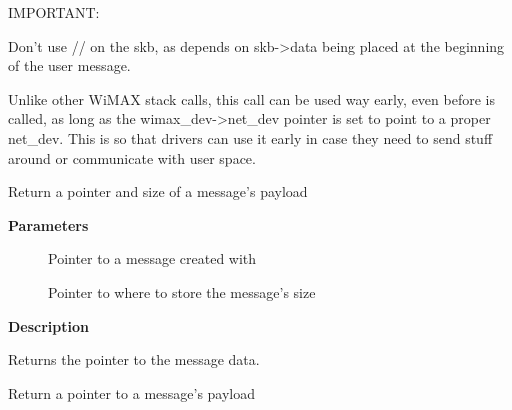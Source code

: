 \documentclass[a4paper,8pt,english]{sphinxmanual}
\begin{document}
IMPORTANT:

Don't use {\hyperref[networking/kapi:c.skb_push]{\emph{}}}/{\hyperref[networking/kapi:c.skb_pull]{\emph{}}}/{\hyperref[networking/kapi:c.skb_reserve]{\emph{}}} on the skb, as
{\hyperref[networking/kapi:c.wimax_msg_send]{\emph{}}} depends on skb-\textgreater{}data being placed at the
beginning of the user message.

Unlike other WiMAX stack calls, this call can be used way early,
even before {\hyperref[networking/kapi:c.wimax_dev_add]{\emph{}}} is called, as long as the
wimax\_dev-\textgreater{}net\_dev pointer is set to point to a proper
net\_dev. This is so that drivers can use it early in case they need
to send stuff around or communicate with user space.

\begin{fulllineitems}
\label{networking/kapi:c.wimax_msg_data_len}
Return a pointer and size of a message's payload

\end{fulllineitems}


\textbf{Parameters}
\begin{description}
\item[{}] \leavevmode
Pointer to a message created with {\hyperref[networking/kapi:c.wimax_msg_alloc]{\emph{}}}

\item[{}] \leavevmode
Pointer to where to store the message's size

\end{description}

\textbf{Description}

Returns the pointer to the message data.

\begin{fulllineitems}
\label{networking/kapi:c.wimax_msg_data}
Return a pointer to a message's payload

\end{fulllineitems}
\end{document}

